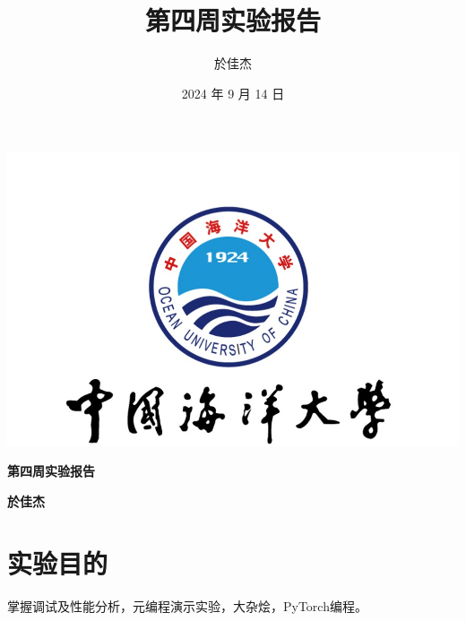 \documentclass[UTF8]{ctexart}
\begin{document}
\begin{center}
    \includegraphics[width=\textwidth]{o} %
\end{center}

\begin{center}
    \huge\textbf{第四周实验报告}
\end{center}

\begin{center}
    \huge\textbf{於佳杰}
\end{center}
\newpage
\title{第四周实验报告}
\author{於佳杰}
\date{2024 年 9 月 14 日}
\maketitle
{}
\tableofcontents
\newpage



\pagestyle{fancy}
\fancyhf{}
\renewcommand{\headrulewidth}{1pt}
\renewcommand{\footrulewidth}{1pt}
\fancyhead[C]{\rightmark}
\fancyfoot[C]{\thepage}
\fancyhead[R]{\thepage}








\section{实验目的}
{\color{red}掌握调试及性能分析，元编程演示实验，大杂烩，PyTorch编程。}
\end{document}
